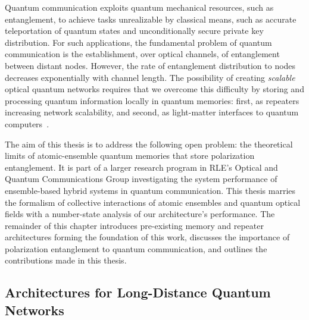 \documentclass[aps,twocolumn,secnumarabic,amsmath,amssymb,pra,groupedaddress,
showpacs, showkeys]{revtex4-1}
\begin{document}
Quantum communication exploits quantum mechanical resources, such as
entanglement, to achieve tasks unrealizable by classical means, such as
accurate teleportation of quantum states and unconditionally secure private key
distribution. For such applications, the fundamental problem of quantum
communication is the establishment, over optical channels, of entanglement
between distant nodes. However, the rate of entanglement distribution to nodes
decreases exponentially with channel length. The possibility of creating
\emph{scalable} optical quantum networks requires that we overcome this
difficulty by storing and processing quantum information locally in quantum
memories: first, as repeaters increasing network scalability, and second, as
light-matter interfaces to quantum computers~\cite{nature07127}.

The aim of this thesis is to address the following open problem: the
theoretical limits of atomic-ensemble quantum memories that store polarization
entanglement. It is part of a larger research program in RLE's Optical and
Quantum Communications Group investigating the system performance of
ensemble-based hybrid systems in quantum communication. This thesis marries the
formalism of collective interactions of atomic ensembles and quantum optical
fields with a number-state analysis of our architecture's performance. The
remainder of this chapter introduces pre-existing memory and repeater
architectures forming the foundation of this work, discusses the importance of
polarization entanglement to quantum communication, and outlines the
contributions made in this thesis.

\subsection{Architectures for Long-Distance Quantum Networks\label{sec:intro:architectures}}
\end{document}
